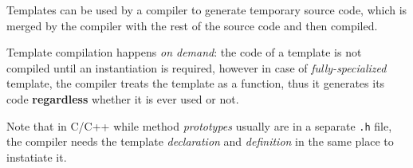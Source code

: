 Templates can be used by a compiler to
generate temporary source code, which is
merged by the compiler with the rest of the
source code and then compiled.

Template compilation happens \textit{on demand}: the code of a template
is not compiled until an instantiation is required,
however in case of \textit{fully-specialized} template,
the compiler treats the template as a function, thus it generates its code \textbf{regardless} whether it is ever used or not.

Note that in C/C++ while method \textit{prototypes} usually are in a separate \lstinline{.h} file,
the compiler needs the template \textit{declaration} and \textit{definition} in the same place to instatiate it. 

\lstset{style=javaBlock}